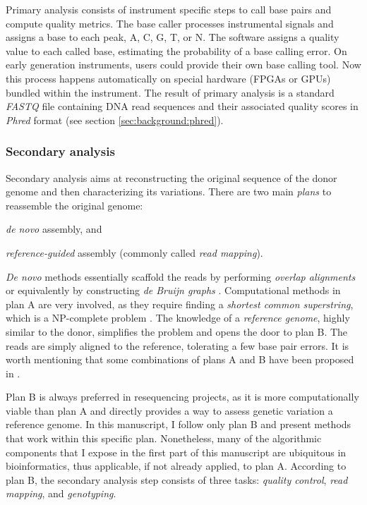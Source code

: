 Primary analysis consists of instrument specific steps to call base pairs and compute quality metrics.
The base caller processes instrumental signals and assigns a base to each peak, \ie A, C, G, T, or N.
The software assigns a quality value to each called base, estimating the probability of a base calling error.
On early generation instruments, users could provide their own base calling tool.
Now this process happens automatically on special hardware (\eg FPGAs or GPUs) bundled within the instrument.
The result of primary analysis is a standard \emph{FASTQ} file containing DNA read sequences and their associated quality scores in \emph{Phred} format (see section \ref{sec:background:phred}).

\subsubsection{Secondary analysis}

Secondary analysis aims at reconstructing the original sequence of the donor genome and then characterizing its variations.
There are two main \emph{plans} to reassemble the original genome: \begin{inparaenum}[(A)]
\item \emph{de novo} assembly, and
\item \emph{reference-guided} assembly (commonly called \emph{read mapping}).
\end{inparaenum}
\emph{De novo} methods essentially scaffold the reads by performing \emph{overlap alignments} \citep{?} or equivalently by constructing \emph{de Bruijn graphs} \citep{?}.
Computational methods in plan A are very involved, as they require finding a \emph{shortest common superstring}, which is a NP-complete problem \citep{?}.
The knowledge of a \emph{reference genome}, highly similar to the donor, simplifies the problem and opens the door to plan B.
The reads are simply aligned to the reference, tolerating a few base pair errors.
It is worth mentioning that some combinations of plans A and B have been proposed in \citep{fermi,?}.

Plan B is always preferred in resequencing projects, as it is more computationally viable than plan A and directly provides a way to assess genetic variation \wrt a reference genome.
In this manuscript, I follow only plan B and present methods that work within this specific plan.
Nonetheless, many of the algorithmic components that I expose in the first part of this manuscript are ubiquitous in bioinformatics, thus applicable, if not already applied, to plan A.
According to plan B, the secondary analysis step consists of three tasks: \emph{quality control}, \emph{read mapping}, and \emph{genotyping}.

